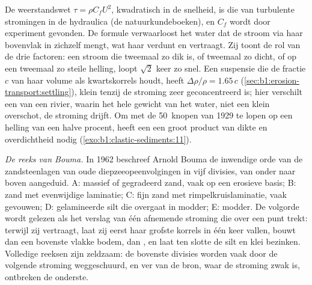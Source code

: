 De weerstandswet $\tau = \rho C_f U^2$, kwadratisch in de snelheid, is die van turbulente stromingen in de hydraulica (de natuurkundeboeken), en $C_f$ wordt door experiment gevonden. De formule verwaarloost het water dat de stroom via haar bovenvlak in zichzelf mengt, wat haar verdunt en vertraagt. Zij toont de rol van de drie factoren: een stroom die tweemaal zo dik is, of tweemaal zo dicht, of op een tweemaal zo steile helling, loopt $\sqrt 2$ keer zo snel. Een suspensie die de fractie $c$ van haar volume als kwartskorrels houdt, heeft $\Delta\rho/\rho = 1.65\,c$ (\cref{sec:b1:erosion-transport:settling}), klein tenzij de stroming zeer geconcentreerd is; hier verschilt een  van een rivier, waarin het hele gewicht van het water, niet een klein overschot, de stroming drijft. Om met de \qty{50}{knopen} van 1929 te lopen op een helling van een halve procent, heeft een  een groot product van dikte en overdichtheid nodig (\cref{exo:b1:clastic-sediments:11}).

\emph{De reeks van Bouma.} In 1962 beschreef Arnold Bouma de inwendige orde van de zandsteenlagen van oude diepzeeopeenvolgingen in vijf divisies, van onder naar boven aangeduid. A: massief of gegradeerd zand, vaak op een erosieve basis; B: zand met evenwijdige laminatie; C: fijn zand met rimpelkruislaminatie, vaak gevouwen; D: gelamineerde silt die overgaat in modder; E: modder. De volgorde wordt gelezen als het verslag van één afnemende stroming die over een punt trekt: terwijl zij vertraagt, laat zij eerst haar grofste korrels in één keer vallen, bouwt dan een bovenste vlakke bodem, dan , en laat ten slotte de silt en klei bezinken. Volledige reeksen zijn zeldzaam: de bovenste divisies worden vaak door de volgende stroming weggeschuurd, en ver van de bron, waar de stroming zwak is, ontbreken de onderste.

